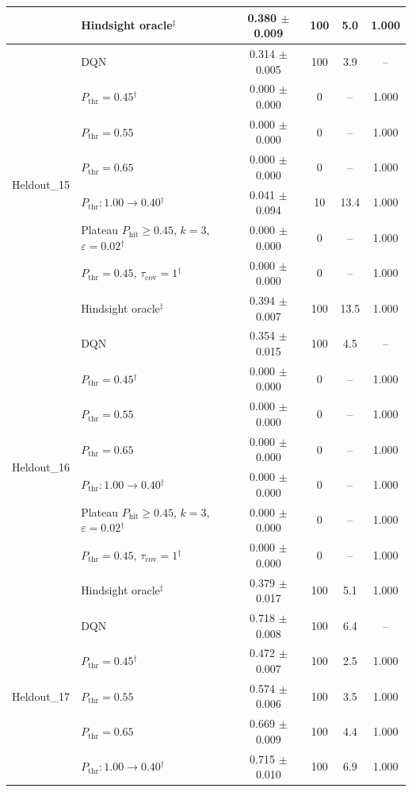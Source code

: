 \begin{table}[htbp]
\begin{tabular}{llcccc}
 & Hindsight oracle$^{\ddagger}$ & 0.380 $\pm$ 0.009 & 100 & 5.0 & 1.000 \\
\midrule
\multirow{8}{*}{Heldout\_15} & DQN & 0.314 $\pm$ 0.005 & 100 & 3.9 & -- \\
 & $P_{\mathrm{thr}}=0.45$$^{\dagger}$ & 0.000 $\pm$ 0.000 & 0 & -- & 1.000 \\
 & $P_{\mathrm{thr}}=0.55$ & 0.000 $\pm$ 0.000 & 0 & -- & 1.000 \\
 & $P_{\mathrm{thr}}=0.65$ & 0.000 $\pm$ 0.000 & 0 & -- & 1.000 \\
 & $P_{\mathrm{thr}}: 1.00 \to 0.40$$^{\dagger}$ & 0.041 $\pm$ 0.094 & 10 & 13.4 & 1.000 \\
 & Plateau $P_{\mathrm{hit}}\geq0.45$, $k=3$, $\varepsilon=0.02$$^{\dagger}$ & 0.000 $\pm$ 0.000 & 0 & -- & 1.000 \\
 & $P_{\mathrm{thr}}=0.45$, $\tau_{\mathrm{cov}}=1$$^{\dagger}$ & 0.000 $\pm$ 0.000 & 0 & -- & 1.000 \\
 & Hindsight oracle$^{\ddagger}$ & 0.394 $\pm$ 0.007 & 100 & 13.5 & 1.000 \\
\midrule
\multirow{8}{*}{Heldout\_16} & DQN & 0.354 $\pm$ 0.015 & 100 & 4.5 & -- \\
 & $P_{\mathrm{thr}}=0.45$$^{\dagger}$ & 0.000 $\pm$ 0.000 & 0 & -- & 1.000 \\
 & $P_{\mathrm{thr}}=0.55$ & 0.000 $\pm$ 0.000 & 0 & -- & 1.000 \\
 & $P_{\mathrm{thr}}=0.65$ & 0.000 $\pm$ 0.000 & 0 & -- & 1.000 \\
 & $P_{\mathrm{thr}}: 1.00 \to 0.40$$^{\dagger}$ & 0.000 $\pm$ 0.000 & 0 & -- & 1.000 \\
 & Plateau $P_{\mathrm{hit}}\geq0.45$, $k=3$, $\varepsilon=0.02$$^{\dagger}$ & 0.000 $\pm$ 0.000 & 0 & -- & 1.000 \\
 & $P_{\mathrm{thr}}=0.45$, $\tau_{\mathrm{cov}}=1$$^{\dagger}$ & 0.000 $\pm$ 0.000 & 0 & -- & 1.000 \\
 & Hindsight oracle$^{\ddagger}$ & 0.379 $\pm$ 0.017 & 100 & 5.1 & 1.000 \\
\midrule
\multirow{8}{*}{Heldout\_17} & DQN & 0.718 $\pm$ 0.008 & 100 & 6.4 & -- \\
 & $P_{\mathrm{thr}}=0.45$$^{\dagger}$ & 0.472 $\pm$ 0.007 & 100 & 2.5 & 1.000 \\
 & $P_{\mathrm{thr}}=0.55$ & 0.574 $\pm$ 0.006 & 100 & 3.5 & 1.000 \\
 & $P_{\mathrm{thr}}=0.65$ & 0.669 $\pm$ 0.009 & 100 & 4.4 & 1.000 \\
 & $P_{\mathrm{thr}}: 1.00 \to 0.40$$^{\dagger}$ & 0.715 $\pm$ 0.010 & 100 & 6.9 & 1.000 \\

\end{tabular}
\end{table}
